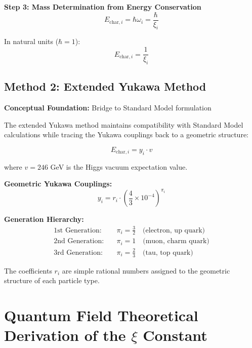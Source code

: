 	\textbf{Step 3: Mass Determination from Energy Conservation}
	\begin{equation}
		E_{\text{char},i} = \hbar \omega_i = \frac{\hbar}{\xi_i}
		\label{eq:energy_from_frequency}
	\end{equation}
	
	In natural units ($\hbar = 1$):
	\begin{equation}
		\boxed{E_{\text{char},i} = \frac{1}{\xi_i}}
		\label{eq:characteristic_energy_direct}
	\end{equation}
	
	\subsection{Method 2: Extended Yukawa Method}
	\label{subsec:extended_yukawa_method}
	
	\textbf{Conceptual Foundation:} Bridge to Standard Model formulation
	
	The extended Yukawa method maintains compatibility with Standard Model calculations while tracing the Yukawa couplings back to a geometric structure:
	
	\begin{equation}
		E_{\text{char},i} = y_i \cdot v
		\label{eq:yukawa_mass_formula}
	\end{equation}
	
	where $v = 246$ GeV is the Higgs vacuum expectation value.
	
	\textbf{Geometric Yukawa Couplings:}
	\begin{equation}
		\boxed{y_i = r_i \cdot \left(\frac{4}{3} \times 10^{-4}\right)^{\pi_i}}
		\label{eq:geometric_yukawa}
	\end{equation}
	
	\textbf{Generation Hierarchy:}
	\begin{align}
		\text{1st Generation:} \quad &\pi_i = \frac{3}{2} \quad \text{(electron, up quark)} \\
		\text{2nd Generation:} \quad &\pi_i = 1 \quad \text{(muon, charm quark)} \\
		\text{3rd Generation:} \quad &\pi_i = \frac{2}{3} \quad \text{(tau, top quark)}
	\end{align}
	
	The coefficients $r_i$ are simple rational numbers assigned to the geometric structure of each particle type.
	
	\section{Quantum Field Theoretical Derivation of the $\xi$ Constant}
	\label{sec:qft_derivation}
	

